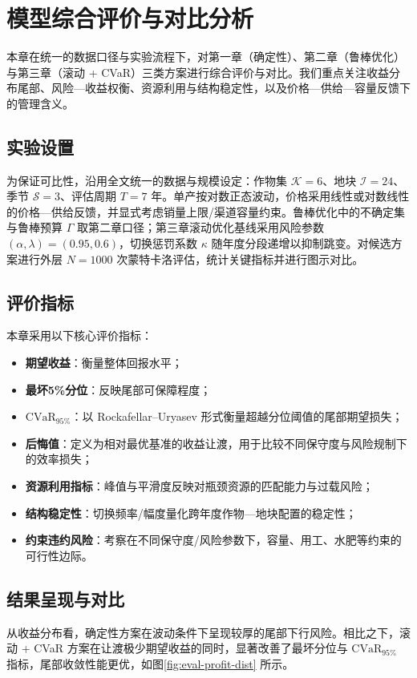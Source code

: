 \section{模型综合评价与对比分析}
\label{sec:evaluation}

本章在统一的数据口径与实验流程下，对第一章（确定性）、第二章（鲁棒优化）与第三章（滚动 + CVaR）三类方案进行综合评价与对比。我们重点关注收益分布尾部、风险—收益权衡、资源利用与结构稳定性，以及价格—供给—容量反馈下的管理含义。

\subsection{实验设置}
为保证可比性，沿用全文统一的数据与规模设定：作物集 $\mathcal K=6$、地块 $\mathcal I=24$、季节 $\mathcal S=3$、评估周期 $T=7$ 年。单产按对数正态波动，价格采用线性或对数线性的价格—供给反馈，并显式考虑销量上限/渠道容量约束。鲁棒优化中的不确定集与鲁棒预算 $\Gamma$ 取第二章口径；第三章滚动优化基线采用风险参数 $(\alpha,\lambda)=(0.95,0.6)$，切换惩罚系数 $\kappa$ 随年度分段递增以抑制跳变。对候选方案进行外层 $N=1000$ 次蒙特卡洛评估，统计关键指标并进行图示对比。

\subsection{评价指标}
本章采用以下核心评价指标：
\begin{itemize}
  \item \textbf{期望收益}：衡量整体回报水平；
  \item \textbf{最坏5\%分位}：反映尾部可保障程度；
  \item \textbf{$\mathrm{CVaR}_{95\%}$}：以 Rockafellar–Uryasev 形式衡量超越分位阈值的尾部期望损失；
  \item \textbf{后悔值}：定义为相对最优基准的收益让渡，用于比较不同保守度与风险规制下的效率损失；
  \item \textbf{资源利用指标}：峰值与平滑度反映对瓶颈资源的匹配能力与过载风险；
  \item \textbf{结构稳定性}：切换频率/幅度量化跨年度作物—地块配置的稳定性；
  \item \textbf{约束违约风险}：考察在不同保守度/风险参数下，容量、用工、水肥等约束的可行性边际。
\end{itemize}

\subsection{结果呈现与对比}
从收益分布看，确定性方案在波动条件下呈现较厚的尾部下行风险。相比之下，滚动 + CVaR 方案在让渡极少期望收益的同时，显著改善了最坏分位与 $\mathrm{CVaR}_{95\%}$ 指标，尾部收敛性能更优，如图\ref{fig:eval-profit-dist} 所示。


